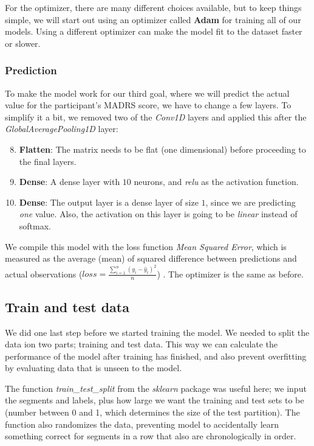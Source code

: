 For the optimizer, there are many different choices available,
but to keep things simple, we will start out using an optimizer called \textbf{Adam} for training all of our models. Using a different optimizer can make the 
model fit to the dataset faster or slower. 

\subsubsection{Prediction}
To make the model work for our third goal, where we will predict the actual value for the participant's MADRS score, we have to change a few layers. To simplify it a bit, we removed two of the \textit{Conv1D} layers and applied this after the \textit{GlobalAveragePooling1D} layer:

\begin{enumerate}
      \setcounter{enumi}{7}
      \item \textbf{Flatten}: The matrix needs to be flat (one dimensional) before proceeding to the final layers.
      \item \textbf{Dense}: A dense layer with $10$ neurons, and \textit{relu} as the activation function. 
      \item \textbf{Dense}: The output layer is a dense layer of size $1$, since we are predicting \textit{one} value. 
            Also, the activation on this layer is going to be \textit{linear} instead of softmax.
\end{enumerate}

We compile this model with the loss function \textit{Mean Squared Error}, which is measured as the average (mean) of squared difference between predictions and actual observations ($ loss = \frac{\sum_{i=1}^{n}(y_i-\hat{y}_i)^2}{n} $) \cite{loss_functions}. The optimizer is the same as before.

\subsection{Train and test data}
We did one last step before we started training the model. We needed to split the data ion two parts; training and test data. This way we can calculate the performance of the model after training has finished, and also prevent overfitting by evaluating data that is unseen to the model. 

The function \textit{train\_test\_split} from the \textit{sklearn} package was useful here; we input the segments and labels, plus how large we want the training and test sets to be (number between 0 and 1, which determines the size of the test partition). The function also randomizes the data, preventing model to accidentally learn something correct for segments in a row that also are chronologically in order.

